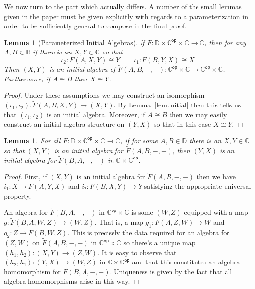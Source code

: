 \documentclass{amsart}
\newtheorem{lem}[thm]{Lemma}
\newcommand{\Ccat}{\ensuremath{\mathbb{C}}}
\newcommand{\Dcat}{\ensuremath{\mathbb{D}}}
\newcommand{\op}[1]{\ensuremath{#1^{\mathsf{op}}}}
\newcommand{\symmetrize}[1]{\ensuremath{\widetilde{#1}}}
\begin{document}
We now turn to the part which actually differs. A number of the small
lemmas given in the paper must be given explicitly with regards to a
parameterization in order to be sufficiently general to compose in the
final proof.
\begin{lem}[Parameterized Initial Algebras]\label{lem:parameterized-initial-algebra}
  If $F : \Dcat \times \op{\Ccat} \times \Ccat \to \Ccat$, then for
  any $A, B \in \Dcat$ if there is an $X, Y \in \Ccat$ so that
  \[
    \iota_2 : F(A, X, Y) \cong Y \qquad \iota_1 : F(B, Y, X) \cong X
  \]
  Then $(X, Y)$ is an initial algebra of
  $\symmetrize{F}(A, B, -, -) : \op{\Ccat} \times \Ccat \to \op{\Ccat}
  \times \Ccat$. Furthermore, if $A \cong B$ then $X \cong Y$.
\end{lem}
\begin{proof}
  Under these assumptions we may construct an isomorphism
  $(\iota_1, \iota_2) : \symmetrize{F}(A, B, X, Y) \to (X, Y)$. By
  Lemma~\ref{lem:initial} then this tells us that $(\iota_1, \iota_2)$
  is an initial algebra. Moreover, if $A \cong B$ then we may easily
  construct an initial algebra structure on $(Y, X)$ so that in this
  case $X \cong Y$.
\end{proof}
\begin{lem}\label{lem:flipped-initial-algebras}
  For all
  $F : \Dcat \times \op{\Ccat} \times \Ccat \to \Ccat$,
  if for some $A, B \in \Dcat$ there is an $X, Y \in \Ccat$ so that
  $(X, Y)$ is an initial algebra for $\symmetrize{F}(A, B, -, -)$, then
  $(Y, X)$ is an initial algebra for $\symmetrize{F}(B, A, -, -)$ in
  $\Ccat \times \op{\Ccat}$.
\end{lem}
\begin{proof}
  First, if $(X, Y)$ is an initial algebra for
  $\symmetrize{F}(A, B, -, -)$ then we have $i_1 : X \to F(A, Y, X)$
  and $i_2 : F(B, X, Y) \to Y$ satisfying the appropriate universal
  property.

  An algebra for $\symmetrize{F}(B, A, -, -)$ in
  $\op{\Ccat} \times \Ccat$ is some $(W, Z)$ equipped with a map
  $g : \symmetrize{F}(B, A, W, Z) \to (W, Z)$. That is, a map
  $g_1 : F(A, Z, W) \to W$ and $g_2 : Z \to F(B, W, Z)$. This is
  precisely the data required for an algebra for $(Z, W)$ on
  $\symmetrize{F}(A, B, -, -)$ in $\op{\Ccat} \times \Ccat$ so there's
  a unique map $(h_1, h_2) : (X, Y) \to (Z, W)$. It is easy to observe
  that $(h_2, h_1) : (Y, X) \to (W, Z)$ in $\Ccat \times \op{\Ccat}$
  and that this constitutes an algebra homomorphism for
  $F(B, A, -, -)$. Uniqueness is given by the fact that all algebra
  homomorphisms arise in this way.
\end{proof}
\end{document}
